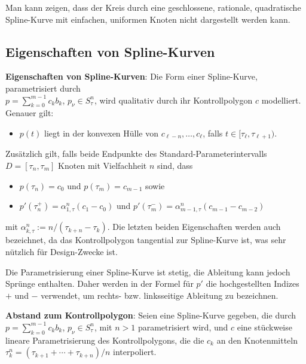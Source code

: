 Man kann zeigen, dass der Kreis durch eine geschlossene, rationale, quadratische
Spline-Kurve mit einfachen, uniformen Knoten nicht dargestellt werden kann.

\subsection{%
    Eigenschaften von Spline-Kurven%
}

\textbf{Eigenschaften von Spline-Kurven}:
Die Form einer Spline-Kurve, parametrisiert durch\\
$p = \sum_{k=0}^{m-1} c_k b_k$, $p_\nu \in S_\tau^n$,
wird qualitativ durch ihr Kontrollpolygon $c$ modelliert.
Genauer gilt:
\begin{itemize}
    \item
    $p(t)$ liegt in der konvexen Hülle von $c_{\ell-n}, \dotsc, c_\ell$, falls
    $t \in [\tau_\ell, \tau_{\ell+1})$.
\end{itemize}
Zusätzlich gilt, falls beide Endpunkte des Standard-Parameterintervalls $D = [\tau_n, \tau_m]$
Knoten mit Vielfachheit $n$ sind, dass
\begin{itemize}
    \item
    $p(\tau_n) = c_0$ und $p(\tau_m) = c_{m-1}$ sowie

    \item
    $p'(\tau_n^+) = \alpha_{1,\tau}^n (c_1 - c_0)$ und
    $p'(\tau_m^-) = \alpha_{m-1,\tau}^n (c_{m-1} - c_{m-2})$
\end{itemize}
mit $\alpha_{k,\tau}^n := n/(\tau_{k+n} - \tau_k)$.
Die letzten beiden Eigenschaften werden auch  bezeichnet,
da das Kontrollpolygon tangential zur Spline-Kurve ist, was sehr nützlich für Design-Zwecke ist.

Die Parametrisierung einer Spline-Kurve ist stetig, die Ableitung kann jedoch Sprünge enthalten.
Daher werden in der Formel für $p'$ die hochgestellten Indizes $+$ und $-$ verwendet,
um rechts- bzw. linksseitige Ableitung zu bezeichnen.

\linie
\pagebreak

\textbf{Abstand zum Kontrollpolygon}:
Seien eine Spline-Kurve gegeben, die durch $p = \sum_{k=0}^{m-1} c_k b_k$, $p_\nu \in S_\tau^n$,
mit $n > 1$ parametrisiert wird,
und $c$ eine stückweise lineare Parametrisierung des Kontrollpolygons,
die die $c_k$ an den Knotenmitteln $\tau_k^n = (\tau_{k+1} + \dotsb + \tau_{k+n})/n$
interpoliert.

